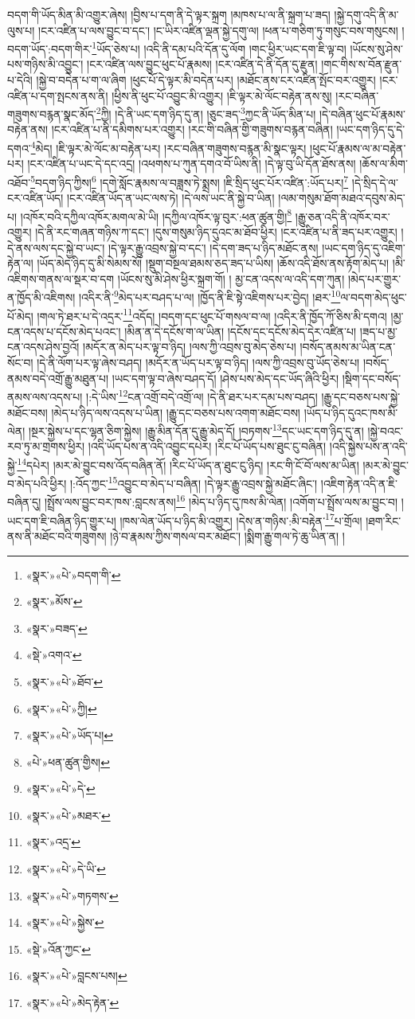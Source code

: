 \documentclass[12pt,a4paper]{book}
\begin{document}
བདག་གི་ཡོད་མིན་མི་འགྱུར་ཞེས། །བྱིས་པ་དག་ནི་དེ་ལྟར་སྐྲག །མཁས་པ་ལ་ནི་སྐྲག་པ་ཟད། །སྐྱེ་དགུ་འདི་ནི་མ་ལུས་པ། །ངར་འཛིན་པ་ལས་བྱུང་བ་དང་། །ང་ཡིར་འཛིན་ལྡན་སྐྱེ་དགུ་ལ། །ཕན་པ་གཅིག་ཏུ་གསུང་བས་གསུངས། །བདག་ཡོད་:བདག་གིར་\footnote{«སྣར་»«པེ་»བདག་གི་}ཡོད་ཅེས་པ། །འདི་ནི་དམ་པའི་དོན་དུ་ལོག །གང་ཕྱིར་ཡང་དག་ཇི་ལྟ་བ། །ཡོངས་སུ་ཤེས་པས་གཉིས་མི་འབྱུང་། །ངར་འཛིན་ལས་བྱུང་ཕུང་པོ་རྣམས། །ངར་འཛིན་དེ་ནི་དོན་དུ་རྫུན། །གང་གིས་ས་བོན་རྫུན་པ་དེའི། །སྐྱེ་བ་བདེན་པ་ག་ལ་ཞིག །ཕུང་པོ་དེ་ལྟར་མི་བདེན་པར། །མཐོང་ནས་ངར་འཛིན་སྤོང་བར་འགྱུར། །ངར་འཛིན་པ་དག་སྤངས་ནས་ནི། །ཕྱིས་ནི་ཕུང་པོ་འབྱུང་མི་འགྱུར། །ཇི་ལྟར་མེ་ལོང་བརྟེན་ནས་སུ། །རང་བཞིན་གཟུགས་བརྙན་སྣང་མོད་\footnote{«སྣར་»མོས་}ཀྱི། །དེ་ནི་ཡང་དག་ཉིད་དུ་ན། །ཅུང་ཟད་\footnote{«སྣར་»བཟད་}ཀྱང་ནི་ཡོད་མིན་པ། །དེ་བཞིན་ཕུང་པོ་རྣམས་བརྟེན་ནས། །ངར་འཛིན་པ་ནི་དམིགས་པར་འགྱུར། །རང་གི་བཞིན་གྱི་གཟུགས་བརྙན་བཞིན། །ཡང་དག་ཉིད་དུ་དེ་དགའ་\footnote{«སྡེ་»འགའ་}མེད། །ཇི་ལྟར་མེ་ལོང་མ་བརྟེན་པར། །རང་བཞིན་གཟུགས་བརྙན་མི་སྣང་ལྟར། །ཕུང་པོ་རྣམས་ལ་མ་བརྟེན་པར། །ངར་འཛིན་པ་ཡང་དེ་དང་འདྲ། །འཕགས་པ་ཀུན་དགའ་བོ་ཡིས་ནི། །དེ་ལྟ་བུ་ཡི་དོན་ཐོས་ནས། །ཆོས་ལ་མིག་འཐོབ་\footnote{«སྣར་»«པེ་»ཐོབ་}བདག་ཉིད་ཀྱིས།\footnote{«སྣར་»«པེ་»ཀྱི།} །དགེ་སློང་རྣམས་ལ་བཟླས་ཏེ་སྨྲས། །ཇི་སྲིད་ཕུང་པོར་འཛིན་:ཡོད་པར།\footnote{«སྣར་»«པེ་»ཡོད་པ།} །དེ་སྲིད་དེ་ལ་ངར་འཛིན་ཡོད། །ངར་འཛིན་ཡོད་ན་ཡང་ལས་ཏེ། །དེ་ལས་ཡང་ནི་སྐྱེ་བ་ཡིན། །ལམ་གསུམ་ཐོག་མཐའ་དབུས་མེད་པ། །འཁོར་བའི་དཀྱིལ་འཁོར་མགལ་མེ་ཡི། །དཀྱིལ་འཁོར་ལྟ་བུར་:ཕན་ཚུན་གྱི།\footnote{«པེ་»ཕན་ཚུན་གྱིས།} །རྒྱུ་ཅན་འདི་ནི་འཁོར་བར་འགྱུར། །དེ་ནི་རང་གཞན་གཉིས་ཀ་དང་། །དུས་གསུམ་ཉིད་དུའང་མ་ཐོབ་ཕྱིར། །ངར་འཛིན་པ་ནི་ཟད་པར་འགྱུར། །དེ་ནས་ལས་དང་སྐྱེ་བ་ཡང་། །དེ་ལྟར་རྒྱུ་འབྲས་སྐྱེ་བ་དང་། །དེ་དག་ཟད་པ་ཉིད་མཐོང་ནས། །ཡང་དག་ཉིད་དུ་འཇིག་རྟེན་ལ། །ཡོད་མེད་ཉིད་དུ་མི་སེམས་སོ། །སྡུག་བསྔལ་ཐམས་ཅད་ཟད་པ་ཡིས། །ཆོས་འདི་ཐོས་ནས་རྟོག་མེད་པ། །མི་འཇིགས་གནས་ལ་སྡར་བ་དག །ཡོངས་སུ་མི་ཤེས་ཕྱིར་སྐྲག་གོ། །
མྱ་ངན་འདས་ལ་འདི་དག་ཀུན། །མེད་པར་གྱུར་ན་ཁྱོད་མི་འཇིགས། །འདིར་ནི་\footnote{«སྣར་»«པེ་»དེ་}མེད་པར་བཤད་པ་ལ། །ཁྱོད་ནི་ཇི་སྟེ་འཇིགས་པར་བྱེད། །ཐར་\footnote{«སྣར་»«པེ་»མཐར་}ལ་བདག་མེད་ཕུང་པོ་མེད། །གལ་ཏེ་ཐར་པ་དེ་འདྲར་\footnote{«སྣར་»འདྲ་}འདོད། །བདག་དང་ཕུང་པོ་གསལ་བ་ལ། །འདིར་ནི་ཁྱོད་ཀོ་ཅིས་མི་དགའ། །མྱ་ངན་འདས་པ་དངོས་མེད་པའང་། །མིན་ན་དེ་དངོས་ག་ལ་ཡིན། །དངོས་དང་དངོས་མེད་དེར་འཛིན་པ། །ཟད་པ་མྱ་ངན་འདས་ཤེས་བྱའོ། །མདོར་ན་མེད་པར་ལྟ་བ་ཉིད། །ལས་ཀྱི་འབྲས་བུ་མེད་ཅེས་པ། །བསོད་ནམས་མ་ཡིན་ངན་སོང་བ། །དེ་ནི་ལོག་པར་ལྟ་ཞེས་བཤད། །མདོར་ན་ཡོད་པར་ལྟ་བ་ཉིད། །ལས་ཀྱི་འབྲས་བུ་ཡོད་ཅེས་པ། །བསོད་ནམས་བདེ་འགྲོ་རྒྱུ་མཐུན་པ། །ཡང་དག་ལྟ་བ་ཞེས་བཤད་དོ། །ཤེས་པས་མེད་དང་ཡོད་ཞིའི་ཕྱིར། །སྡིག་དང་བསོད་ནམས་ལས་འདས་པ། །:དེ་ཡིས་\footnote{«སྣར་»«པེ་»དེ་ཡི་}ངན་འགྲོ་བདེ་འགྲོ་ལ། །དེ་ནི་ཐར་པར་དམ་པས་བཤད། །རྒྱུ་དང་བཅས་པས་སྐྱེ་མཐོང་བས། །མེད་པ་ཉིད་ལས་འདས་པ་ཡིན། །རྒྱུ་དང་བཅས་པས་འགག་མཐོང་བས། །ཡོད་པ་ཉིད་དུའང་ཁས་མི་ལེན། །སྔར་སྐྱེས་པ་དང་ལྷན་ཅིག་སྐྱེས། །རྒྱུ་མིན་དོན་དུ་རྒྱུ་མེད་དོ། །བཏགས་\footnote{«སྣར་»«པེ་»གཏགས་}དང་ཡང་དག་ཉིད་དུ་ན། །སྐྱེ་བའང་རབ་ཏུ་མ་གྲགས་ཕྱིར། །འདི་ཡོད་པས་ན་འདི་འབྱུང་དཔེར། །རིང་པོ་ཡོད་པས་ཐུང་ངུ་བཞིན། །འདི་སྐྱེས་པས་ན་འདི་སྐྱེ་\footnote{«སྣར་»«པེ་»སྐྱེས་}དཔེར། །མར་མེ་བྱུང་བས་འོད་བཞིན་ནོ། །རིང་པོ་ཡོད་ན་ཐུང་ངུ་ཉིད། །རང་གི་ངོ་བོ་ལས་མ་ཡིན། །མར་མེ་བྱུང་བ་མེད་པའི་ཕྱིར། །:འོད་ཀྱང་\footnote{«སྡེ་»འོན་ཀྱང་}འབྱུང་བ་མེད་པ་བཞིན། །དེ་ལྟར་རྒྱུ་འབྲས་སྐྱེ་མཐོང་ཞིང་། །འཇིག་རྟེན་འདི་ན་ཇི་བཞིན་དུ། །སྤྲོས་ལས་བྱུང་བར་ཁས་:བླངས་ནས།\footnote{«སྣར་»«པེ་»བླངས་པས།} །མེད་པ་ཉིད་དུ་ཁས་མི་ལེན། །འགོག་པ་སྤྲོས་ལས་མ་བྱུང་བ། །ཡང་དག་ཇི་བཞིན་ཉིད་གྱུར་པ། །ཁས་ལེན་ཡོད་པ་ཉིད་མི་འགྱུར། །དེས་ན་གཉིས་:མི་བརྟེན་\footnote{«སྣར་»«པེ་»མེད་རྟེན་}པ་གྲོལ། །ཐག་རིང་ནས་ནི་མཐོང་བའི་གཟུགས། །ཉེ་བ་རྣམས་ཀྱིས་གསལ་བར་མཐོང་། །སྨིག་རྒྱུ་གལ་ཏེ་ཆུ་ཡིན་ན། །
\end{document}
